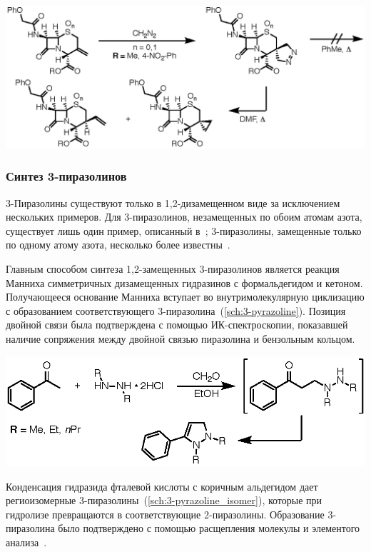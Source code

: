 \begin{scheme}[h!]
    \centering
    \includegraphics{sections/literature/img/cefalosporine.eps}
    \caption{}
    \label{sch:cefalosporine}
\end{scheme}
\FloatBarrier{}


\subsubsection{Синтез 3-пиразолинов}
3-Пиразолины существуют только в 1,2-дизамещенном виде за исключением нескольких примеров.
Для 3-пиразолинов, незамещенных по обоим атомам азота, существует лишь один пример, описанный в~\cite{Misani1956}; 3-пиразолины, замещенные только по одному атому азота, несколько более известны~\cite{Takamizawa1963, Takamizawa1965, Armstrong1973, Burger1979}.

Главным способом синтеза 1,2-замещенных 3-пиразолинов является реакция Манниха симметричных дизамещенных гидразинов с формальдегидом и кетоном. Получающееся основание Манниха вступает во внутримолекулярную циклизацию с образованием соответствующего 3-пиразолина~(\ref{sch:3-pyrazoline}).
Позиция двойной связи была подтверждена с помощью ИК-спектроскопии, показавшей наличие сопряжения между двойной связью пиразолина и бензольным кольцом.

\begin{scheme}[h!]
    \centering
    \includegraphics{sections/literature/img/3-pyrazoline.eps}
    \caption{}
    \label{sch:3-pyrazoline}
\end{scheme}

Конденсация гидразида фталевой кислоты с коричным альдегидом дает региоизомерные 3-пиразолины~(\ref{sch:3-pyrazoline_isomer}), которые при гидролизе превращаются в соответствующие 2-пиразолины.
Образование 3-пиразолина было подтверждено с помощью расщепления молекулы и элементого анализа~\cite{Chemistry1967}.

